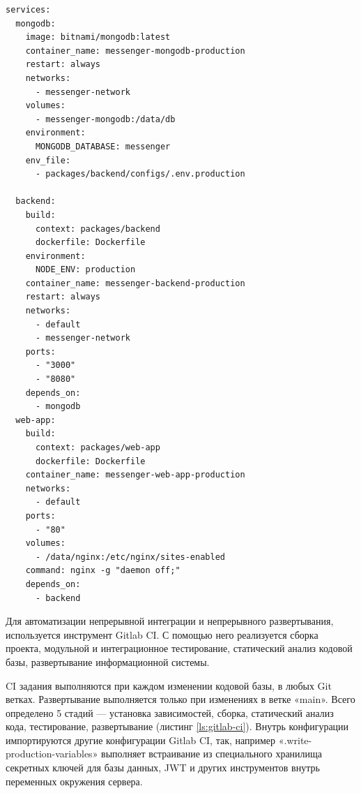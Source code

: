 \begin{lstlisting}[caption={Конфигурация Docker Compose}, label={ls:docker-compose}]
services:
  mongodb:
    image: bitnami/mongodb:latest
    container_name: messenger-mongodb-production
    restart: always
    networks:
      - messenger-network
    volumes:
      - messenger-mongodb:/data/db
    environment:
      MONGODB_DATABASE: messenger
    env_file:
      - packages/backend/configs/.env.production

  backend:
    build:
      context: packages/backend
      dockerfile: Dockerfile
    environment:
      NODE_ENV: production
    container_name: messenger-backend-production
    restart: always
    networks:
      - default
      - messenger-network
    ports:
      - "3000"
      - "8080"
    depends_on:
      - mongodb
  web-app:
    build:
      context: packages/web-app
      dockerfile: Dockerfile
    container_name: messenger-web-app-production
    networks:
      - default
    ports:
      - "80"
    volumes:
      - /data/nginx:/etc/nginx/sites-enabled
    command: nginx -g "daemon off;"
    depends_on:
      - backend
\end{lstlisting}

Для автоматизации непрерывной интеграции и непрерывного развертывания, используется инструмент Gitlab CI. С помощью него реализуется сборка проекта, модульной и интеграционное тестирование, статический анализ кодовой базы, развертывание информационной системы.

CI задания выполняются при каждом изменении кодовой базы, в любых Git ветках. Развертывание выполняется только при изменениях в ветке «main». Всего определено 5 стадий — установка зависимостей, сборка, статический анализ кода, тестирование, развертывание (листинг \ref{ls:gitlab-ci}). Внутрь конфигурации импортируются другие конфигурации Gitlab CI, так, например 	«.write-production-variables» выполняет встраивание из специального хранилища секретных ключей для базы данных, JWT и других инструментов внутрь переменных окружения сервера.

